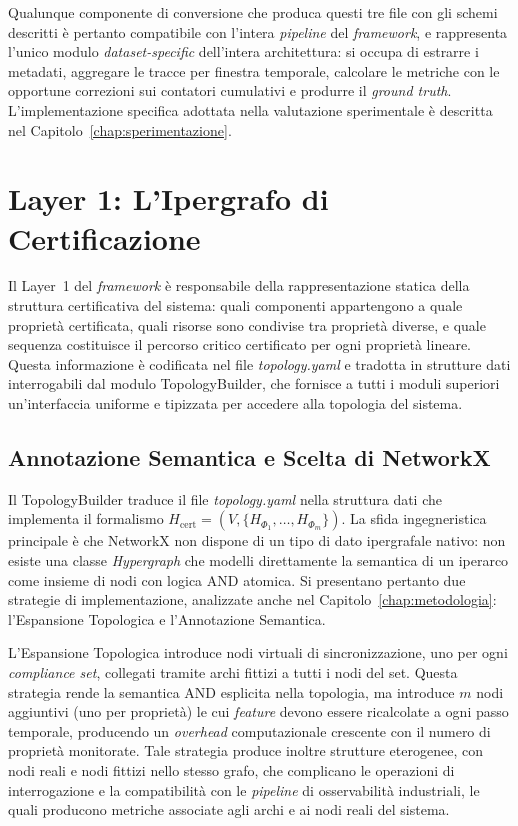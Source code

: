 Qualunque componente di conversione che produca questi tre file con gli schemi descritti è
pertanto compatibile con l'intera \textit{pipeline} del \textit{framework},
e rappresenta l'unico modulo \textit{dataset-specific}
dell'intera architettura: si occupa di estrarre i metadati, aggregare le tracce per finestra
temporale, calcolare le metriche con le opportune correzioni sui contatori cumulativi e
produrre il \textit{ground truth}. L'implementazione specifica adottata nella valutazione
sperimentale è descritta nel Capitolo~\ref{chap:sperimentazione}.

\section{Layer 1: L'Ipergrafo di Certificazione}
\label{sec:impl_layer1}

Il Layer~1 del \textit{framework} è responsabile della rappresentazione statica della struttura
certificativa del sistema: quali componenti appartengono a quale proprietà certificata, quali
risorse sono condivise tra proprietà diverse, e quale sequenza costituisce il percorso critico
certificato per ogni proprietà lineare. Questa informazione è codificata nel file
\textit{topology.yaml} e tradotta in strutture dati interrogabili dal modulo TopologyBuilder,
che fornisce a tutti i moduli superiori un'interfaccia uniforme e tipizzata per accedere alla
topologia del sistema.

\subsection{Annotazione Semantica e Scelta di NetworkX}
\label{subsec:annotazione_semantica}

Il TopologyBuilder traduce il file \textit{topology.yaml} nella struttura dati che implementa
il formalismo $H_{\text{cert}} = (V, \{H_{\Phi_1}, \ldots, H_{\Phi_m}\})$. La sfida
ingegneristica principale è che NetworkX non dispone di un tipo di dato ipergrafale nativo:
non esiste una classe \textit{Hypergraph} che modelli direttamente la semantica di un iperarco
come insieme di nodi con logica AND atomica. Si presentano pertanto due strategie di
implementazione, analizzate anche nel Capitolo~\ref{chap:metodologia}: l'Espansione Topologica
e l'Annotazione Semantica.

L'Espansione Topologica introduce nodi virtuali di sincronizzazione, uno per ogni
\textit{compliance set}, collegati tramite archi fittizi a tutti i nodi del set. Questa strategia
rende la semantica AND esplicita nella topologia, ma introduce $m$ nodi aggiuntivi (uno per
proprietà) le cui \textit{feature} devono essere ricalcolate a ogni passo temporale, producendo
un \textit{overhead} computazionale crescente con il numero di proprietà monitorate. Tale strategia produce
inoltre strutture eterogenee, con nodi reali e nodi fittizi nello stesso grafo, che complicano le
operazioni di interrogazione e la compatibilità con le \textit{pipeline} di osservabilità
industriali, le quali producono metriche associate agli archi e ai nodi reali del sistema.

